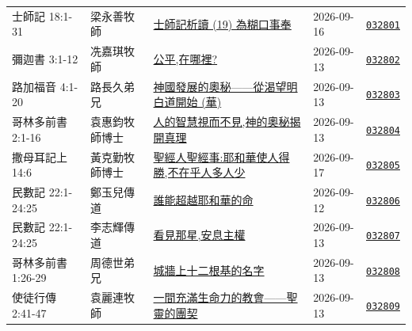 \documentclass{book}
\begin{document}
{ \scriptsize


\begin{xltabular}{\textwidth}{|p{0.15\textwidth} p{0.15\textwidth} p{0.45\textwidth}|p{0.07\textwidth} p{0.1\textwidth}|}
\hline
士師記 18:1-31 & 梁永善牧師 & \hyperref[sec:032801]{士師記析讀 (19) 為糊口事奉} & 2026-09-16 & \href{http://www.church.com.hk/acms/content.asp?site=cdc\&op=show\&type=product\&code=032801\&layout=sermon}{\texttt{032801}} \\
彌迦書 3:1-12 & 冼嘉琪牧師 & \hyperref[sec:032802]{公平,在哪裡?} & 2026-09-13 & \href{http://www.church.com.hk/acms/content.asp?site=cdc\&op=show\&type=product\&code=032802\&layout=sermon}{\texttt{032802}} \\
路加福音 4:1-20 & 路長久弟兄 & \hyperref[sec:032803]{神國發展的奧秘——從渴望明白道開始 (華)} & 2026-09-13 & \href{http://www.church.com.hk/acms/content.asp?site=cdc\&op=show\&type=product\&code=032803\&layout=sermon}{\texttt{032803}} \\
哥林多前書 2:1-16 & 袁惠鈞牧師博士 & \hyperref[sec:032804]{人的智慧視而不見,神的奧秘揭開真理} & 2026-09-13 & \href{http://www.church.com.hk/acms/content.asp?site=cdc\&op=show\&type=product\&code=032804\&layout=sermon}{\texttt{032804}} \\
撒母耳記上 14:6 & 黃克勤牧師博士 & \hyperref[sec:032805]{聖經人聖經事:耶和華使人得勝,不在乎人多人少} & 2026-09-17 & \href{http://www.church.com.hk/acms/content.asp?site=cdc\&op=show\&type=product\&code=032805\&layout=sermon}{\texttt{032805}} \\
民數記 22:1-24:25 & 鄭玉兒傳道 & \hyperref[sec:032806]{誰能超越耶和華的命} & 2026-09-12 & \href{http://www.church.com.hk/acms/content.asp?site=cdc\&op=show\&type=product\&code=032806\&layout=sermon}{\texttt{032806}} \\
民數記 22:1-24:25 & 李志輝傳道 & \hyperref[sec:032807]{看見那星,安息主權} & 2026-09-13 & \href{http://www.church.com.hk/acms/content.asp?site=cdc\&op=show\&type=product\&code=032807\&layout=sermon}{\texttt{032807}} \\
哥林多前書 1:26-29 & 周德世弟兄 & \hyperref[sec:032808]{城牆上十二根基的名字} & 2026-09-13 & \href{http://www.church.com.hk/acms/content.asp?site=cdc\&op=show\&type=product\&code=032808\&layout=sermon}{\texttt{032808}} \\
使徒行傳 2:41-47 & 袁麗連牧師 & \hyperref[sec:032809]{一間充滿生命力的教會——聖靈的團契} & 2026-09-13 & \href{http://www.church.com.hk/acms/content.asp?site=cdc\&op=show\&type=product\&code=032809\&layout=sermon}{\texttt{032809}} \\

\end{xltabular}}
\end{document}
